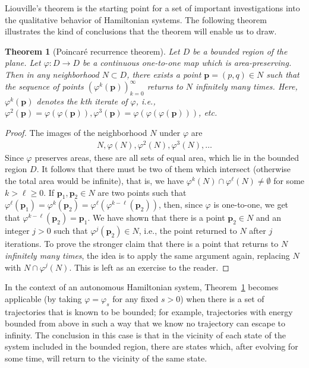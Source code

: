 \documentclass[12pt]{amsart}
\newcommand{\eqst}[1]{\begin{align*}#1\end{align*}}
\newtheorem{thm}{Theorem}
\newcounter{example}
\newcounter{exercise}
\begin{document}
Liouville's theorem is the starting point for a set of important investigations into the qualitative behavior of Hamiltonian systems. The following theorem illustrates the kind of conclusions that the theorem will enable us to draw.

\begin{thm}[Poincar\'e recurrence theorem]
\label{thm:poincare-recurrence}
Let $D$ be a bounded region of the plane. Let $\varphi:D\to D$ be a continuous one-to-one map which is area-preserving. Then in any neighborhood $N\subset D$, there exists a point $\mathbf{p}=(p,q) \in N$ such that the sequence of points $(\varphi^k(\mathbf{p}))_{k=0}^\infty$ returns to $N$ infinitely many times. Here, $\varphi^k(\mathbf{p})$ denotes the \emph{$k$th iterate of $\varphi$}, i.e., $\varphi^2(\mathbf{p})=\varphi(\varphi(\mathbf{p})), \varphi^3(\mathbf{p})=\varphi(\varphi(\varphi(\mathbf{p})))$, etc.
\end{thm}

\begin{proof}
The images of the neighborhood $N$ under $\varphi$ are
\eqst{ N, \varphi(N), \varphi^2(N), \varphi^3(N), \ldots }
Since $\varphi$ preserves areas, these are all sets of equal area, which lie in the bounded region $D$. It follows that there must be two of them which intersect (otherwise the total area would be infinite), that is, we have $\varphi^k(N) \cap \varphi^\ell(N) \neq \emptyset$ for some $k>\ell\ge 0$. If $\mathbf{p}_1, \mathbf{p}_2 \in N$ are two points such that $\varphi^\ell(\mathbf{p}_1)=\varphi^k(\mathbf{p}_2)=\varphi^\ell(\varphi^{k-\ell}(\mathbf{p}_2))$, then, since $\varphi$ is one-to-one, we get that $\varphi^{k-\ell}(\mathbf{p}_2)=\mathbf{p}_1$. We have shown that there is a point $\mathbf{p}_2\in N$ and an integer $j>0$ such that $\varphi^j(\mathbf{p}_2)\in N$, i.e., the point returned to $N$ after $j$ iterations. To prove the stronger claim that there is a point that returns to $N$ \emph{infinitely many times}, the idea is to apply the same argument again, replacing $N$ with $N\cap \varphi^j(N)$. This is left as an exercise to the reader.
\end{proof}

In the context of an autonomous Hamiltonian system, Theorem~\ref{thm:poincare-recurrence} becomes applicable (by taking $\varphi=\varphi_s$ for any fixed $s>0$) when there is a set of trajectories that is known to be bounded; for example, trajectories with energy bounded from above in such a way that we know no trajectory can escape to infinity. The conclusion in this case is that in the vicinity of each state of the system included in the bounded region, there are states which, after evolving for some time, will return to the vicinity of the same state.
\end{document}

